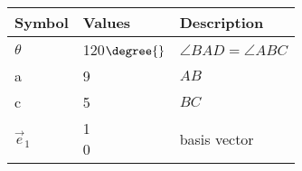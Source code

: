 \begin{tabular}{|p{3cm}|p{3cm}|p{3cm}|}
\hline                                        
\textbf{Symbol} & \textbf{Values} & \textbf{Description}\\                                          
\hline                                 
$\theta$ & 120$\degree{}$   & $\angle{BAD} = \angle{ABC}$ \\           
\hline                                    
a &  9 & $AB$ \\     
\hline                      
c & 5 & $BC$ \\
\hline                                     
		$\vec{e}_1$ & \myvec{
			1\\
			0\\
			} & basis vector\\ 
\hline
\end{tabular}
